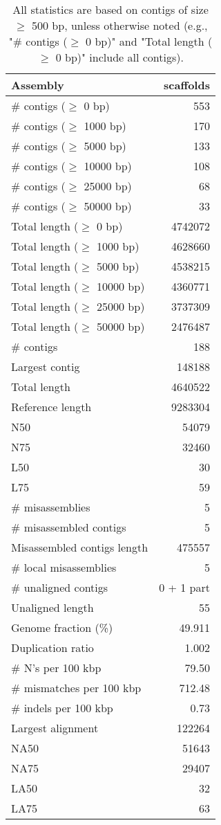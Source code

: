 \documentclass[12pt,a4paper]{article}
\begin{document}
\begin{table}[ht]
\begin{center}
\caption{All statistics are based on contigs of size $\geq$ 500 bp, unless otherwise noted (e.g., "\# contigs ($\geq$ 0 bp)" and "Total length ($\geq$ 0 bp)" include all contigs).}
\begin{tabular}{|l*{1}{|r}|}
\hline
Assembly & scaffolds \\ \hline
\# contigs ($\geq$ 0 bp) & 553 \\ \hline
\# contigs ($\geq$ 1000 bp) & 170 \\ \hline
\# contigs ($\geq$ 5000 bp) & 133 \\ \hline
\# contigs ($\geq$ 10000 bp) & 108 \\ \hline
\# contigs ($\geq$ 25000 bp) & 68 \\ \hline
\# contigs ($\geq$ 50000 bp) & 33 \\ \hline
Total length ($\geq$ 0 bp) & 4742072 \\ \hline
Total length ($\geq$ 1000 bp) & 4628660 \\ \hline
Total length ($\geq$ 5000 bp) & 4538215 \\ \hline
Total length ($\geq$ 10000 bp) & 4360771 \\ \hline
Total length ($\geq$ 25000 bp) & 3737309 \\ \hline
Total length ($\geq$ 50000 bp) & 2476487 \\ \hline
\# contigs & 188 \\ \hline
Largest contig & 148188 \\ \hline
Total length & 4640522 \\ \hline
Reference length & 9283304 \\ \hline
N50 & 54079 \\ \hline
N75 & 32460 \\ \hline
L50 & 30 \\ \hline
L75 & 59 \\ \hline
\# misassemblies & 5 \\ \hline
\# misassembled contigs & 5 \\ \hline
Misassembled contigs length & 475557 \\ \hline
\# local misassemblies & 5 \\ \hline
\# unaligned contigs & 0 + 1 part \\ \hline
Unaligned length & 55 \\ \hline
Genome fraction (\%) & 49.911 \\ \hline
Duplication ratio & 1.002 \\ \hline
\# N's per 100 kbp & 79.50 \\ \hline
\# mismatches per 100 kbp & 712.48 \\ \hline
\# indels per 100 kbp & 0.73 \\ \hline
Largest alignment & 122264 \\ \hline
NA50 & 51643 \\ \hline
NA75 & 29407 \\ \hline
LA50 & 32 \\ \hline
LA75 & 63 \\ \hline
\end{tabular}
\end{center}
\end{table}
\end{document}
